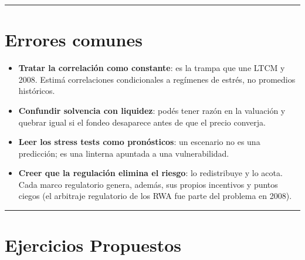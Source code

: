 \documentclass[
  spanish,
  letterpaper,
  DIV=11,
  numbers=noendperiod]{scrreprt}
\providecommand{\tightlist}{%
  \setlength{\itemsep}{0pt}\setlength{\parskip}{0pt}}
\begin{document}
\begin{center}\rule{0.5\linewidth}{0.5pt}\end{center}

\chapter{Errores comunes}\label{errores-comunes-10}

\begin{tcolorbox}[enhanced jigsaw, bottomrule=.15mm, colback=white, opacitybacktitle=0.6, arc=.35mm, toprule=.15mm, opacityback=0, breakable, titlerule=0mm, left=2mm, coltitle=black, colbacktitle=quarto-callout-warning-color!10!white, colframe=quarto-callout-warning-color-frame, leftrule=.75mm, toptitle=1mm, bottomtitle=1mm, title=\textcolor{quarto-callout-warning-color}{\faExclamationTriangle}\hspace{0.5em}{Trampas conceptuales de este capítulo}, rightrule=.15mm]

\begin{itemize}
\tightlist
\item
  \textbf{Tratar la correlación como constante}: es la trampa que une
  LTCM y 2008. Estimá correlaciones condicionales a regímenes de estrés,
  no promedios históricos.
\item
  \textbf{Confundir solvencia con liquidez}: podés tener razón en la
  valuación y quebrar igual si el fondeo desaparece antes de que el
  precio converja.
\item
  \textbf{Leer los stress tests como pronósticos}: un escenario no es
  una predicción; es una linterna apuntada a una vulnerabilidad.
\item
  \textbf{Creer que la regulación elimina el riesgo}: lo redistribuye y
  lo acota. Cada marco regulatorio genera, además, sus propios
  incentivos y puntos ciegos (el arbitraje regulatorio de los RWA fue
  parte del problema en 2008).
\end{itemize}

\end{tcolorbox}

\begin{center}\rule{0.5\linewidth}{0.5pt}\end{center}

\chapter{Ejercicios Propuestos}\label{ejercicios-propuestos-11}
\end{document}
